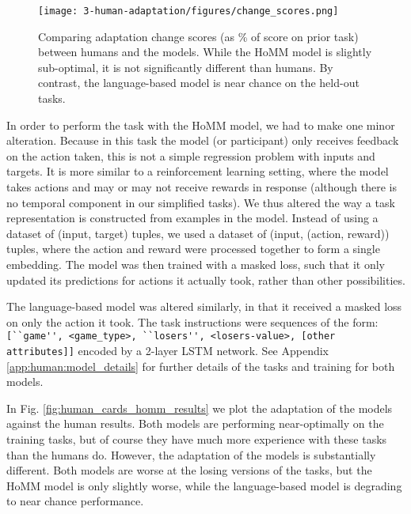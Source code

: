 \begin{figure}
\centering
\texttt{[image: 3-human-adaptation/figures/change\_scores.png]}
\caption[Comparing adaptation change scores between the humans and models.]{Comparing adaptation change scores (as \% of score on prior task) between humans and the models. While the HoMM model is slightly sub-optimal, it is not significantly different than humans. By contrast, the language-based model is near chance on the held-out tasks.} \label{fig:human_cards_homm_change_scores}
\end{figure}
In order to perform the task with the HoMM model, we had to make one minor alteration. Because in this task the model (or participant) only receives feedback on the action taken, this is not a simple regression problem with inputs and targets. It is more similar to a reinforcement learning setting, where the model takes actions and may or may not receive rewards in response (although there is no temporal component in our simplified tasks). We thus altered the way a task representation is constructed from examples in the model. Instead of using a dataset of (input, target) tuples, we used a dataset of (input, (action, reward)) tuples, where the action and reward were processed together to form a single embedding. The model was then trained with a masked loss, such that it only updated its predictions for actions it actually took, rather than other possibilities. \par
The language-based model was altered similarly, in that it received a masked loss on only the action it took. The task instructions were sequences of the form:\\\verb|[``game'', <game_type>, ``losers'', <losers-value>, [other attributes]]| encoded by a 2-layer LSTM network. See Appendix \ref{app:human:model_details} for further details of the tasks and training for both models.\par
In Fig. \ref{fig:human_cards_homm_results} we plot the adaptation of the models against the human results. Both models are performing near-optimally on the training tasks, but of course they have much more experience with these tasks than the humans do. However, the adaptation of the models is substantially different. Both models are worse at the losing versions of the tasks, but the HoMM model is only slightly worse, while the language-based model is degrading to near chance performance. \par
